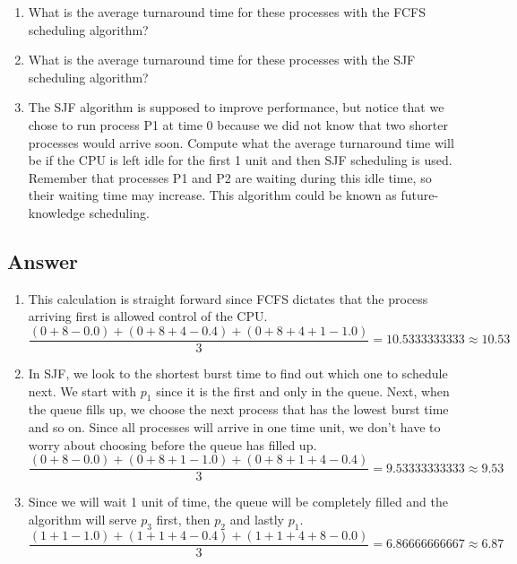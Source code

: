 \documentclass[a4paper,11pt]{article}
\begin{document}
\begin{enumerate}[label=\alph*.]
    \item What is the average turnaround time for these processes with the FCFS scheduling algorithm?
    \item What is the average turnaround time for these processes with the SJF scheduling algorithm?
    \item The SJF algorithm is supposed to improve performance, but notice that we chose to run process P1 at time 0 because we did not know that two shorter processes would arrive soon. Compute what the average turnaround time will be if the CPU is left idle for the first 1 unit and then SJF scheduling is used. Remember that processes P1 and P2 are waiting during this idle time, so their waiting time may increase. This algorithm could be known as future-knowledge scheduling.
\end{enumerate}

\subsection{Answer}
\begin{enumerate}[label=\alph*.]
    \item This calculation is straight forward since FCFS dictates that the process arriving first is allowed control of the CPU.
    $$\frac{(0+8-0.0)+(0+8+4-0.4)+(0+8+4+1-1.0)}{3}=10.5333333333 \approx 10.53$$

    \item In SJF, we look to the shortest burst time to find out which one to schedule next. We start with  $p_1$ since it is the first and only in the queue. Next, when the queue fills up, we choose the next process that has the lowest burst time and so on. Since all processes will arrive in one time unit, we don't have to worry about choosing before the queue has filled up.
    $$\frac{(0+8-0.0)+(0+8+1-1.0)+(0+8+1+4-0.4)}{3}=9.53333333333 \approx 9.53$$

    \item Since we will wait 1 unit of time, the queue will be completely filled and the algorithm will serve $p_3$ first, then $p_2$ and lastly $p_1$.
    $$\frac{(1+1-1.0)+(1+1+4-0.4)+(1+1+4+8-0.0)}{3}=6.86666666667 \approx 6.87$$
\end{enumerate}


\pagebreak
\end{document}
